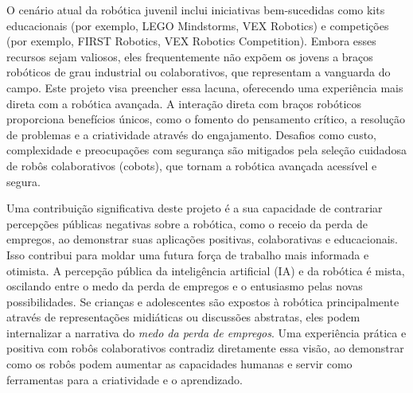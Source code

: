\documentclass[%
  a4paper,%
  12pt,%
  fleqn,%
  english,%
  brazilian,%
]{article}
\begin{document}
O cenário atual da robótica juvenil inclui iniciativas bem-sucedidas como kits educacionais (por exemplo, LEGO Mindstorms, VEX Robotics) e competições (por exemplo, FIRST Robotics, VEX Robotics Competition). Embora esses recursos sejam valiosos, eles frequentemente não expõem os jovens a braços robóticos de grau industrial ou colaborativos, que representam a vanguarda do campo. Este projeto visa preencher essa lacuna, oferecendo uma experiência mais direta com a robótica avançada. A interação direta com braços robóticos proporciona benefícios únicos, como o fomento do pensamento crítico, a resolução de problemas e a criatividade através do engajamento. Desafios como custo, complexidade e preocupações com segurança são mitigados pela seleção cuidadosa de robôs colaborativos (cobots), que tornam a robótica avançada acessível e segura.

Uma contribuição significativa deste projeto é a sua capacidade de contrariar percepções públicas negativas sobre a robótica, como o receio da perda de empregos, ao demonstrar suas aplicações positivas, colaborativas e educacionais. Isso contribui para moldar uma futura força de trabalho mais informada e otimista. A percepção pública da inteligência artificial (IA) e da robótica é mista, oscilando entre o medo da perda de empregos e o entusiasmo pelas novas possibilidades. Se crianças e adolescentes são expostos à robótica principalmente através de representações midiáticas ou discussões abstratas, eles podem internalizar a narrativa do \emph{medo da perda de empregos}. Uma experiência prática e positiva com robôs colaborativos contradiz diretamente essa visão, ao demonstrar como os robôs podem aumentar as capacidades humanas e servir como ferramentas para a criatividade e o aprendizado.


\printbibliography%
\end{document}
